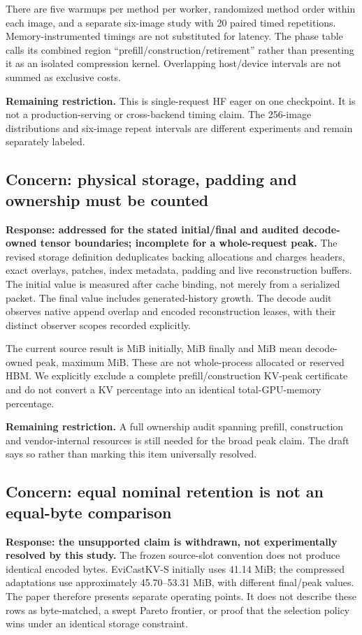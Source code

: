 \documentclass[11pt]{article}
\begin{document}
There are five warmups per method per worker, randomized method order
within each image, and a separate six-image study with 20 paired timed
repetitions. Memory-instrumented timings are not substituted for latency.
The phase table calls its combined region
``prefill/construction/retirement'' rather than presenting it as an
isolated compression kernel. Overlapping host/device intervals are not
summed as exclusive costs.

\textbf{Remaining restriction.} This is single-request HF eager on one
checkpoint. It is not a production-serving or cross-backend timing claim.
The 256-image distributions and six-image repeat intervals are different
experiments and remain separately labeled.

\subsection{Concern: physical storage, padding and ownership must be counted}
\textbf{Response: addressed for the stated initial/final and audited
decode-owned tensor boundaries; incomplete for a whole-request peak.}
The revised storage definition deduplicates backing allocations and
charges headers, exact overlays, patches, index metadata, padding and
live reconstruction buffers. The initial value is measured after cache
binding, not merely from a serialized packet. The final value includes
generated-history growth. The decode audit observes native append overlap
and encoded reconstruction leases, with their distinct observer scopes
recorded explicitly.

The current source result is \EviInitial{} MiB initially,
\EviFinal{} MiB finally and \EviPeak{} MiB mean decode-owned peak,
maximum \EviMaxPeak{} MiB. These are not whole-process allocated or
reserved HBM. We explicitly exclude a complete prefill/construction
KV-peak certificate and do not convert a KV percentage into an identical
total-GPU-memory percentage.

\textbf{Remaining restriction.} A full ownership audit spanning prefill,
construction and vendor-internal resources is still needed for the broad
peak claim. The draft says so rather than marking this item universally
resolved.

\subsection{Concern: equal nominal retention is not an equal-byte comparison}
\textbf{Response: the unsupported claim is withdrawn, not experimentally
resolved by this study.}
The frozen source-slot convention does not produce identical encoded
bytes. EviCastKV-S initially uses 41.14 MiB; the compressed adaptations
use approximately 45.70--53.31 MiB, with different final/peak values.
The paper therefore presents separate operating points. It does not
describe these rows as byte-matched, a swept Pareto frontier, or proof
that the selection policy wins under an identical storage constraint.
\end{document}
